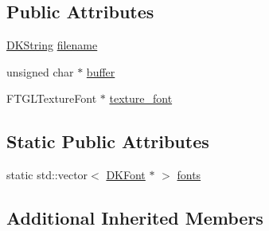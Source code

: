 \subsection*{Public Attributes}
\begin{DoxyCompactItemize}
\item 
\hyperlink{_d_k_string_8h_ac168e8555ceba18e1a2919b21976bc84}{D\-K\-String} \hyperlink{class_d_k_font_ad93a32fc400f5ce91d7e65e8222c5665}{filename}
\item 
unsigned char $\ast$ \hyperlink{class_d_k_font_afd3286763bda71d401e9fde6d07d51af}{buffer}
\item 
F\-T\-G\-L\-Texture\-Font $\ast$ \hyperlink{class_d_k_font_a10afb3fd2e315f208a52190e1b907df6}{texture\-\_\-font}
\end{DoxyCompactItemize}
\subsection*{Static Public Attributes}
\begin{DoxyCompactItemize}
\item 
static std\-::vector$<$ \hyperlink{class_d_k_font}{D\-K\-Font} $\ast$ $>$ \hyperlink{class_d_k_font_a04e98f175cdb9b59782de93e4d3d4c18}{fonts}
\end{DoxyCompactItemize}
\subsection*{Additional Inherited Members}


